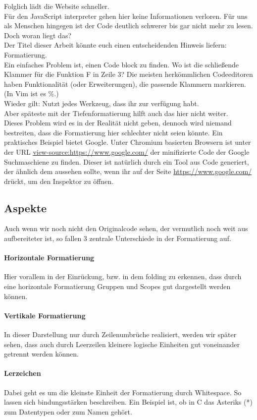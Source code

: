 		Folglich lädt die Website schneller.\\
		Für den JavaScript interpreter gehen hier keine Informationen verloren.
		Für uns als Menschen hingegen ist der Code deutlich schwerer bis gar nicht mehr zu lesen.\\
		Doch woran liegt das?\\
		Der Titel dieser Arbeit könnte euch einen entscheidenden Hinweis liefern: Formatierung.\\
		Ein einfaches Problem ist, einen Code block zu finden.
		Wo ist die schließende Klammer für die Funktion F in Zeile 3?
		Die meisten herkömmlichen Codeeditoren haben Funktionalität (oder Erweiterungen), die passende Klammern markieren. (In Vim ist es \%.)\\
		Wieder gilt: Nutzt jedes Werkzeug, dass ihr zur verfügung habt.\\
		Aber späteste mit der Tiefenformatierung hilft auch das hier nicht weiter.\\
		Dieses Problem wird es in der Realität nicht geben, dennoch wird niemand bestreiten, dass die Formatierung hier schlechter nicht seien könnte.
		Ein praktisches Beispiel bietet Google. Unter Chromium basierten Browsern ist unter der URL \href{view-source:https://www.google.com/}{view-source:https://www.google.com/} der minifizierte Code der Google Suchmaschiene zu finden.
		Dieser ist natürlich durch ein Tool aus  Code generiert, der ähnlich dem aussehen sollte, wenn ihr auf der Seite \href{https://www.google.com/}{https://www.google.com/}  drückt, um den Inspektor zu öffnen.

	\subsection{Aspekte}
		Auch wenn wir noch nicht den Originalcode sehen, der vermutlich noch weit aus aufbereiteter ist, so fallen 3 zentrale Unterschiede in der Formatierung auf.
		\paragraph{Horizontale Formatierung}
			Hier vorallem in der Einrückung, bzw. in dem folding zu erkennen, dass durch eine horizontale Formatierung Gruppen und Scopes gut dargestellt werden können.
		\paragraph{Vertikale Formatierung}
			In dieser Darstellung nur durch Zeilenumbrüche realisiert, werden wir später sehen, dass auch durch Leerzeilen kleinere logische Einheiten gut voneinander getrennt werden können.
		\paragraph{Lerzeichen}
			Dabei geht es um die kleinste Einheit der Formatierung durch Whitespace.
			So lassen sich bindungsstärken beschreiben.
			Ein Beispiel ist, ob in C das Asteriks (*) zum Datentypen oder zum Namen gehört.

